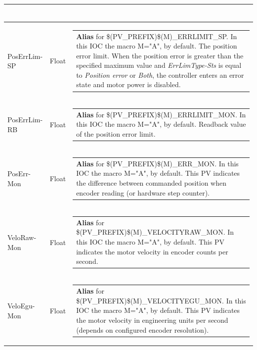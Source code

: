 \documentclass[openany]{article}
\begin{document}
\begin{longtable}{| m{4.5cm} m{2.5cm}  m{8.5cm} |}
\begin{tabular}{@{}m{6cm}@{}}
            \end{tabular} \hypertarget{pv:pos-err-lim}{}\\ \hline
        PosErrLim-SP & Float & \begin{tabular}{@{}m{6cm}@{}}
                \textbf{\color{blue} Alias} for \$(PV\_PREFIX)\$(M)\_ERRLIMIT\_SP. In this IOC the macro M="A", by default. The position error limit. When the position error is greater than the specified maximum value and \emph{ErrLimType-Sts} is equal to \emph{Position error} or \emph{Both}, the controller enters an error state and motor power is disabled.
            \end{tabular} \hypertarget{}{}\\ \hline
        PosErrLim-RB & Float & \begin{tabular}{@{}m{6cm}@{}}
                \textbf{\color{blue} Alias} for \$(PV\_PREFIX)\$(M)\_ERRLIMIT\_MON. In this IOC the macro M="A", by default. Readback value of the position error limit.
            \end{tabular} \hypertarget{pv:pos-err-mon}{}\\ \hline
        PosErr-Mon & Float & \begin{tabular}{@{}m{6cm}@{}}
                \textbf{\color{blue} Alias} for \$(PV\_PREFIX)\$(M)\_ERR\_MON. In this IOC the macro M="A", by default. This PV indicates the difference between commanded position when encoder reading (or hardware step counter).
            \end{tabular} \hypertarget{pv:velo-raw-mon}{}\\ \hline
        VeloRaw-Mon & Float & \begin{tabular}{@{}m{6cm}@{}}
                \textbf{\color{blue} Alias} for \$(PV\_PREFIX)\$(M)\_VELOCITYRAW\_MON. In this IOC the macro M="A", by default. This PV indicates the motor velocity in encoder counts per second.
            \end{tabular} \hypertarget{pv:velo-egu-mon}{}\\ \hline
        VeloEgu-Mon & Float & \begin{tabular}{@{}m{6cm}@{}}
                \textbf{\color{blue} Alias} for \$(PV\_PREFIX)\$(M)\_VELOCITYEGU\_MON. In this IOC the macro M="A", by default. This PV indicates the motor velocity in engineering units per second (depends on configured encoder resolution).
            \end{tabular} \hypertarget{pv:err-lim-type}{}\\ \hline

\end{longtable}
\end{document}
